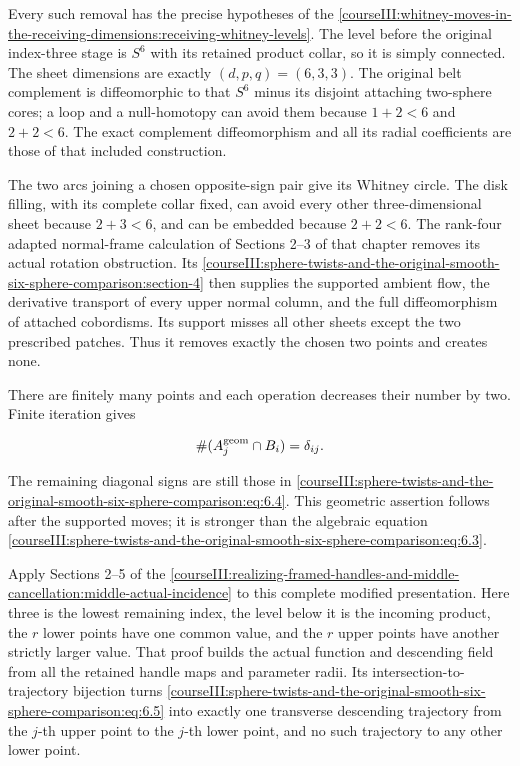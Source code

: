 Every such removal has the precise hypotheses of the \cref{courseIII:whitney-moves-in-the-receiving-dimensions:receiving-whitney-levels}. The level before the original index-three stage is \(S^6\) with its retained product collar, so it is simply connected. The sheet dimensions are exactly \((d,p,q)=(6,3,3)\). The original belt complement is diffeomorphic to that \(S^6\) minus its disjoint attaching two-sphere cores; a loop and a null-homotopy can avoid them because \(1+2<6\) and \(2+2<6\). The exact complement diffeomorphism and all its radial coefficients are those of that included construction.

The two arcs joining a chosen opposite-sign pair give its Whitney circle. The disk filling, with its complete collar fixed, can avoid every other three-dimensional sheet because \(2+3<6\), and can be embedded because \(2+2<6\). The rank-four adapted normal-frame calculation of Sections 2--3 of that chapter removes its actual rotation obstruction. Its \cref{courseIII:sphere-twists-and-the-original-smooth-six-sphere-comparison:section-4} then supplies the supported ambient flow, the derivative transport of every upper normal column, and the full diffeomorphism of attached cobordisms. Its support misses all other sheets except the two prescribed patches. Thus it removes exactly the chosen two points and creates none.

There are finitely many points and each operation decreases their number by two. Finite iteration gives

\begin{equation}
\#(A_j^{\rm geom}\cap B_i)=\delta_{ij}.
 \label{courseIII:sphere-twists-and-the-original-smooth-six-sphere-comparison:eq:6.5}
\end{equation}

The remaining diagonal signs are still those in \eqref{courseIII:sphere-twists-and-the-original-smooth-six-sphere-comparison:eq:6.4}. This geometric assertion follows after the supported moves; it is stronger than the algebraic equation \eqref{courseIII:sphere-twists-and-the-original-smooth-six-sphere-comparison:eq:6.3}.

Apply Sections 2--5 of the \cref{courseIII:realizing-framed-handles-and-middle-cancellation:middle-actual-incidence} to this complete modified presentation. Here three is the lowest remaining index, the level below it is the incoming product, the \(r\) lower points have one common value, and the \(r\) upper points have another strictly larger value. That proof builds the actual function and descending field from all the retained handle maps and parameter radii. Its intersection-to-trajectory bijection turns \eqref{courseIII:sphere-twists-and-the-original-smooth-six-sphere-comparison:eq:6.5} into exactly one transverse descending trajectory from the \(j\)-th upper point to the \(j\)-th lower point, and no such trajectory to any other lower point.

